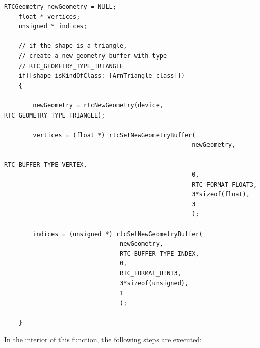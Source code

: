 \begin{listing} 
	\begin{lstlisting}[caption={Setting up geometry buffers for the vertices and indices of a triangle shape.}, label={lst:geometry_buffer}]
	RTCGeometry newGeometry = NULL;
	float * vertices;
	unsigned * indices;
	
	// if the shape is a triangle, 
	// create a new geometry buffer with type
	// RTC_GEOMETRY_TYPE_TRIANGLE
	if([shape isKindOfClass: [ArnTriangle class]]) 
	{
	
		newGeometry = rtcNewGeometry(device, RTC_GEOMETRY_TYPE_TRIANGLE);
		
		vertices = (float *) rtcSetNewGeometryBuffer(
													newGeometry,
													RTC_BUFFER_TYPE_VERTEX,
													0,
													RTC_FORMAT_FLOAT3,
													3*sizeof(float),
													3
													);
		
		indices = (unsigned *) rtcSetNewGeometryBuffer(
		                        newGeometry,
		                        RTC_BUFFER_TYPE_INDEX,
		                        0,
		                        RTC_FORMAT_UINT3,
		                        3*sizeof(unsigned),
		                        1
		                        );
	
	}
	\end{lstlisting}
\end{listing}


In the interior of this function, the following steps are executed:

